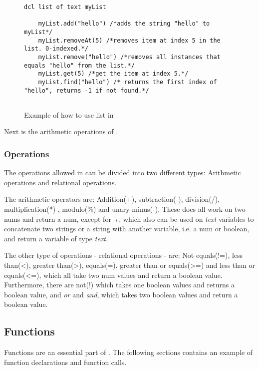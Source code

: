 \begin{figure}[H]
    \centering
    \begin{lstlisting}[style=gglang]
    dcl list of text myList
    
    myList.add("hello") /*adds the string "hello" to myList*/
    myList.removeAt(5) /*removes item at index 5 in the list. 0-indexed.*/
    myList.remove("hello") /*removes all instances that equals "hello" from the list.*/
    myList.get(5) /*get the item at index 5.*/
    myList.find("hello") /* returns the first index of "hello", returns -1 if not found.*/
    
    \end{lstlisting}
    \caption{Example of how to use list in \lang{}}\label{fig:list}
\end{figure}

Next is the arithmetic operations of \lang{}.

\subsubsection{Operations}

The operations allowed in \lang{} can be divided into two different types: Arithmetic operations and relational operations. 

The arithmetic operators are: Addition(+), subtraction(-), division(/), multiplication(*) , modulo(\%) and unary-minus(-). These does all work on two nums and return a num, except for \textit{+}, which also can be used on \textit{text} variables to concatenate two strings or a string with another variable, i.e. a num or boolean, and return a variable of type \textit{text}.

The other type of operations - relational operations - are: Not equals(!=), less than(<), greater than(>), equals(=), greater than or equals(>=) and less than or equals(<=), which all take two num values and return a boolean value. Furthermore, there are not(!) which takes one boolean values and returns a boolean value, and \textit{or} and \textit{and}, which takes two boolean values and return a boolean value.



\subsection{Functions}

Functions are an essential part of \lang{}. The following sections contains an example of function declarations and function calls.

